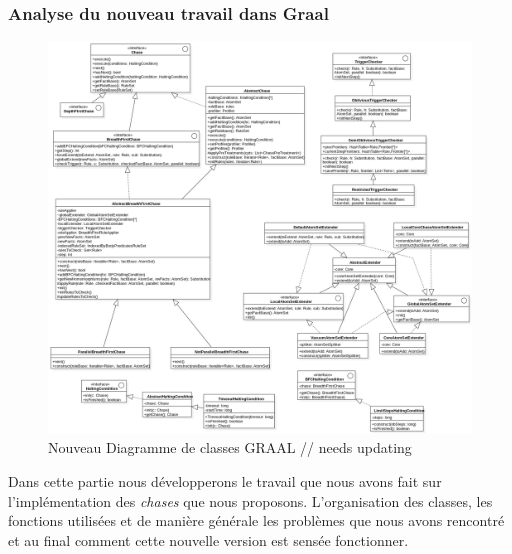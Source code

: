      
    \subsubsection{Analyse du nouveau travail dans Graal}
        \begin{figure}[H]
        \centering
        \includegraphics[width=\textwidth]{pictures/NouveauDiagrammeClasse.png}
        \caption{Nouveau Diagramme de classes GRAAL // needs updating}
        \label{fig:dclasse}
        \end{figure}
        
    Dans cette partie nous développerons le travail que nous avons fait sur l'implémentation des \textit{chases} que nous proposons. L'organisation des classes, les fonctions utilisées et de manière générale les problèmes que nous avons rencontré et au final comment cette nouvelle version est sensée fonctionner.
    
